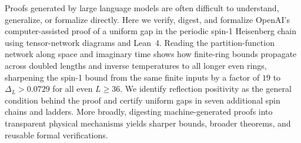 Proofs generated by large language models are often difficult to
understand, generalize, or formalize directly. Here we verify, digest,
and formalize OpenAI's computer-assisted proof of a uniform gap in the
periodic spin-1 Heisenberg chain using tensor-network diagrams and
Lean~4. Reading the partition-function network along space and imaginary
time shows how finite-ring bounds propagate across doubled lengths and
inverse temperatures to all longer even rings, sharpening the spin-1
bound from the same finite inputs by a factor of $19$ to
$\Delta_L>0.0729$ for all even $L\ge36$. We identify reflection
positivity as the general condition behind the proof and certify uniform
gaps in seven additional spin chains and ladders. More broadly,
digesting machine-generated proofs into transparent physical mechanisms
yields sharper bounds, broader theorems, and reusable formal
verifications.